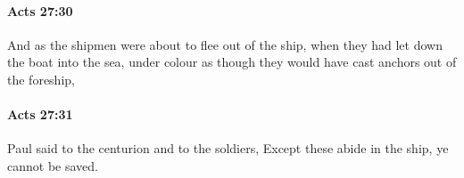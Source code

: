 		\paragraph{Acts 27:30} %
			\label{ACTS-27-30}

			And as the shipmen were about to flee out of the ship, when they had let down the boat into the sea, under colour as though they would have cast anchors out of the foreship,

			\begin{framed}
			\scriptsize
				\begin{compactdesc}
					\item[SBLG] 
				\end{compactdesc}
			\end{framed}

		\paragraph{Acts 27:31} %
			\label{ACTS-27-31}

			Paul said to the centurion and to the soldiers, Except these abide in the ship, ye cannot be saved.

